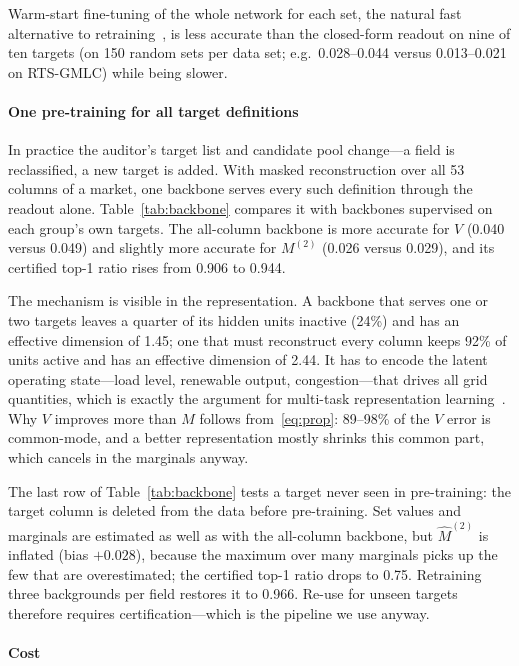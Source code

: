 Warm-start fine-tuning of the whole network for each set, the natural fast alternative to
retraining~\cite{sun2025warmstart}, is less accurate than the closed-form readout on nine of ten
targets (on 150 random sets per data set; e.g.\ 0.028--0.044 versus 0.013--0.021 on RTS-GMLC)
while being slower.



\paragraph{One pre-training for all target definitions}
In practice the auditor's target list and candidate pool change---a field is reclassified, a new
target is added. With masked reconstruction over all 53 columns of a market, one backbone serves
every such definition through the readout alone. Table~\ref{tab:backbone} compares it with
backbones supervised on each group's own targets. The all-column backbone is more accurate for
$V$ (0.040 versus 0.049) and slightly more accurate for $M^{(2)}$ (0.026 versus 0.029), and its
certified top-1 ratio rises from 0.906 to 0.944.

The mechanism is visible in the representation. A backbone that serves one or two targets leaves a
quarter of its hidden units inactive (24\%) and has an effective dimension of 1.45; one that must
reconstruct every column keeps 92\% of units active and has an effective dimension of 2.44. It has
to encode the latent operating state---load level, renewable output, congestion---that drives all
grid quantities, which is exactly the argument for multi-task representation
learning~\cite{caruana1997multitask,baxter2000inductive,maurer2016benefit}. Why $V$ improves more
than $M$ follows from~\eqref{eq:prop}: 89--98\% of the $V$ error is common-mode, and a better
representation mostly shrinks this common part, which cancels in the marginals anyway.

The last row of Table~\ref{tab:backbone} tests a target never seen in pre-training: the target
column is deleted from the data before pre-training. Set values and marginals are estimated as well
as with the all-column backbone, but $\hat M^{(2)}$ is inflated (bias $+0.028$), because the
maximum over many marginals picks up the few that are overestimated; the certified top-1 ratio drops
to 0.75. Retraining three backgrounds per field restores it to 0.966. Re-use for unseen targets
therefore requires certification---which is the pipeline we use anyway.



\paragraph{Cost}

